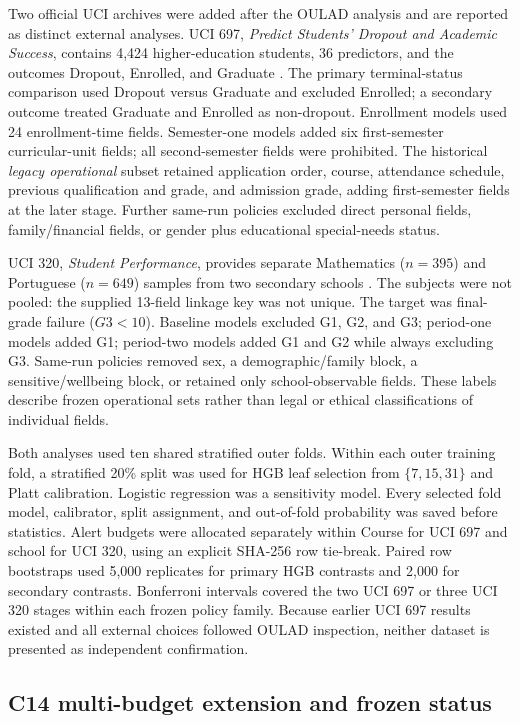 \documentclass[11pt]{article}
\begin{document}
Two official UCI archives were added after the OULAD analysis and are reported as distinct external analyses. UCI 697, \emph{Predict Students' Dropout and Academic Success}, contains 4,424 higher-education students, 36 predictors, and the outcomes Dropout, Enrolled, and Graduate \citep{realinho2021uci697}. The primary terminal-status comparison used Dropout versus Graduate and excluded Enrolled; a secondary outcome treated Graduate and Enrolled as non-dropout. Enrollment models used 24 enrollment-time fields. Semester-one models added six first-semester curricular-unit fields; all second-semester fields were prohibited. The historical \emph{legacy operational} subset retained application order, course, attendance schedule, previous qualification and grade, and admission grade, adding first-semester fields at the later stage. Further same-run policies excluded direct personal fields, family/financial fields, or gender plus educational special-needs status.

UCI 320, \emph{Student Performance}, provides separate Mathematics ($n=395$) and Portuguese ($n=649$) samples from two secondary schools \citep{cortez2008uci320}. The subjects were not pooled: the supplied 13-field linkage key was not unique. The target was final-grade failure ($G3<10$). Baseline models excluded G1, G2, and G3; period-one models added G1; period-two models added G1 and G2 while always excluding G3. Same-run policies removed sex, a demographic/family block, a sensitive/wellbeing block, or retained only school-observable fields. These labels describe frozen operational sets rather than legal or ethical classifications of individual fields.

Both analyses used ten shared stratified outer folds. Within each outer training fold, a stratified 20\% split was used for HGB leaf selection from $\{7,15,31\}$ and Platt calibration. Logistic regression was a sensitivity model. Every selected fold model, calibrator, split assignment, and out-of-fold probability was saved before statistics. Alert budgets were allocated separately within Course for UCI 697 and school for UCI 320, using an explicit SHA-256 row tie-break. Paired row bootstraps used 5,000 replicates for primary HGB contrasts and 2,000 for secondary contrasts. Bonferroni intervals covered the two UCI 697 or three UCI 320 stages within each frozen policy family. Because earlier UCI 697 results existed and all external choices followed OULAD inspection, neither dataset is presented as independent confirmation.

\subsection{C14 multi-budget extension and frozen status}
\end{document}
